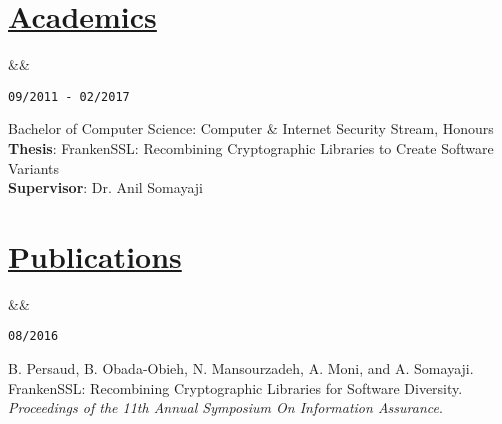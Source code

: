 \documentclass[11pt]{article} %
\newcommand{\heading}[1]{
    \section*{\uline{\hfill #1 }} %
}
\newcommand{\squish}{
\setlength{\itemsep}{0.2pt}
    \setlength{\parskip}{0pt} %
    \setlength{\parsep}{0.2pt}
}
\newcommand{\when}[1]{ %
    \hfill \texttt{#1}
}
\newcommand{\experience}[3]{ %
    \ifx&#2&
\item[{#1}]
    \else
\item[{#1}, \emph{#2}]
    \fi
    \when{#3}
}
\begin{document}
\heading{Academics}%

\begin{description}
        \squish
        \experience{Carleton University}
                   {}
                   {09/2011 - 02/2017}

            Bachelor of Computer Science: Computer \& Internet Security Stream,
            Honours \\
            \textbf{Thesis}: FrankenSSL: Recombining Cryptographic Libraries to
            Create Software Variants \\
            \textbf{Supervisor}: Dr. Anil Somayaji

\end{description}

\heading{Publications}%

\begin{description}
        \squish
        \experience{}
                   {}
                   {08/2016}

            B. Persaud, B. Obada-Obieh, N. Mansourzadeh, A. Moni, and A.
            Somayaji.  FrankenSSL: Recombining Cryptographic Libraries for
            Software Diversity.  \textit{Proceedings of the 11th Annual
            Symposium On Information Assurance}.
\end{description}
\end{document}
